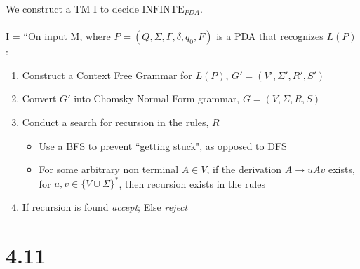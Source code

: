\documentclass{article}
\begin{document}
We construct a TM I to decide $\textrm{INFINTE}_{PDA}$. \\\\
I = ``On input M, where $P=(Q,\Sigma,\Gamma,\delta,q_0,F)$ is a PDA that recognizes $L(P)$:
\begin{enumerate}
    \item Construct a Context Free Grammar for $L(P)$, $G'=(V',\Sigma',R',S')$
    \item Convert $G'$ into Chomsky Normal Form grammar, $G=(V,\Sigma,R,S)$
    \item Conduct a search for recursion in the rules, $R$
    \begin{itemize}
    	\item Use a BFS to prevent ``getting stuck", as opposed to DFS
	\item For some arbitrary non terminal $A \in V$, if the derivation $A \rightarrow uAv$ exists, for $u,v \in \{ V \cup \Sigma \}^*$, then recursion exists in the rules
    \end{itemize}
    \item If recursion is found \textit{accept}; Else \textit{reject}
\end{enumerate}

\section*{4.11}
\end{document}
